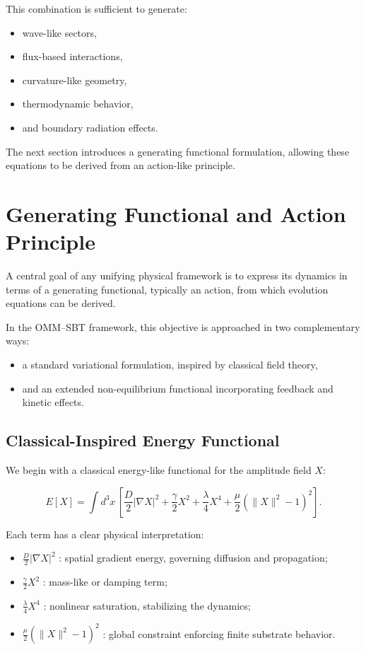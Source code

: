 \documentclass[11pt]{article}
\begin{document}
This combination is sufficient to generate:

\begin{itemize}
\item wave-like sectors,
\item flux-based interactions,
\item curvature-like geometry,
\item thermodynamic behavior,
\item and boundary radiation effects.
\end{itemize}

The next section introduces a generating functional formulation, allowing these equations to be derived from an action-like principle.

\section{Generating Functional and Action Principle}

A central goal of any unifying physical framework is to express its dynamics in terms of a generating functional, typically an action, from which evolution equations can be derived.

In the OMM--SBT framework, this objective is approached in two complementary ways:
\begin{itemize}
\item a standard variational formulation, inspired by classical field theory,
\item and an extended non-equilibrium functional incorporating feedback and kinetic effects.
\end{itemize}

\subsection{Classical-Inspired Energy Functional}

We begin with a classical energy-like functional for the amplitude field $X$:

\begin{equation}
E[X]
=
\int d^3x \,
\left[
\frac{D}{2} |\nabla X|^2
+
\frac{\gamma}{2} X^2
+
\frac{\lambda}{4} X^4
+
\frac{\mu}{2}(\|X\|^2 - 1)^2
\right].
\end{equation}

Each term has a clear physical interpretation:

\begin{itemize}
\item $\frac{D}{2} |\nabla X|^2$ : spatial gradient energy, governing diffusion and propagation;
\item $\frac{\gamma}{2} X^2$ : mass-like or damping term;
\item $\frac{\lambda}{4} X^4$ : nonlinear saturation, stabilizing the dynamics;
\item $\frac{\mu}{2}(\|X\|^2 - 1)^2$ : global constraint enforcing finite substrate behavior.
\end{itemize}
\end{document}
